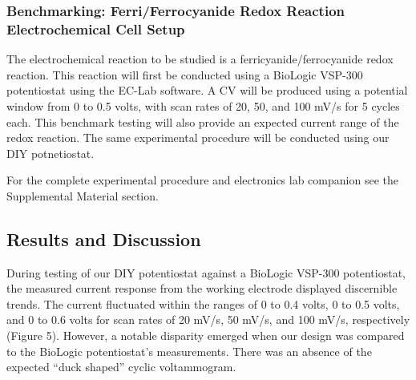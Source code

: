 \documentclass{article}
\begin{document}
\subsubsection*{Benchmarking: Ferri/Ferrocyanide Redox Reaction Electrochemical Cell Setup}

The electrochemical reaction to be studied is a ferricyanide/ferrocyanide redox reaction. This reaction will first be conducted using a BioLogic VSP-300 potentiostat using the EC-Lab software. A CV will be produced using a potential window from 0 to 0.5 volts, with scan rates of 20, 50, and 100 mV/s for 5 cycles each. This benchmark testing will also provide an expected current range of the redox reaction. The same experimental procedure will be conducted using our DIY potnetiostat.

For the complete experimental procedure and electronics lab companion see the Supplemental Material section.


\subsection*{Results and Discussion}

During testing of our DIY potentiostat against a BioLogic VSP-300 potentiostat, the measured current response from the working electrode displayed discernible trends. The current fluctuated within the ranges of 0 to 0.4 volts, 0 to 0.5 volts, and 0 to 0.6 volts for scan rates of 20 mV/s, 50 mV/s, and 100 mV/s, respectively (Figure 5). However, a notable disparity emerged when our design was compared to the BioLogic potentiostat's measurements. There was an absence of the expected “duck shaped” cyclic voltammogram.
\end{document}

